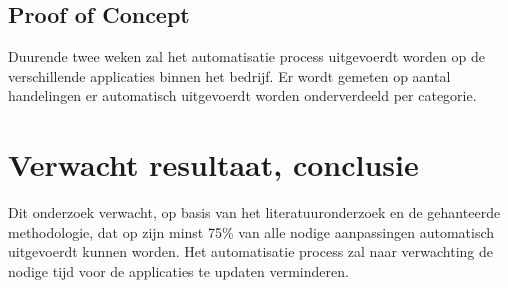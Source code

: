 \subsection{Proof of Concept}

Duurende twee weken zal het automatisatie process uitgevoerdt worden op de verschillende applicaties binnen het bedrijf.
Er wordt gemeten op aantal handelingen er automatisch uitgevoerdt worden onderverdeeld per categorie.

\section{Verwacht resultaat, conclusie}
\label{sec:verwachte_resultaten}

Dit onderzoek verwacht, op basis van het literatuuronderzoek en de gehanteerde methodologie, dat op zijn minst 75\% van alle nodige aanpassingen automatisch uitgevoerdt kunnen worden.
Het automatisatie process zal naar verwachting de nodige tijd voor de applicaties te updaten verminderen.


